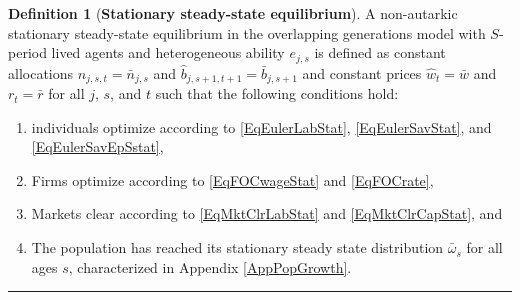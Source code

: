\documentclass[letterpaper,12pt]{article}
\theoremstyle{definition}
\newtheorem{definition}{Definition} %
\begin{document}
    \begin{definition}[\textbf{Stationary steady-state equilibrium}]\label{DefEquilSS}
      A non-autarkic stationary steady-state equilibrium in the overlapping generations model with $S$-period lived agents and heterogeneous ability $e_{j,s}$ is defined as constant allocations $n_{j,s,t}=\bar{n}_{j,s}$ and $\hat{b}_{j,s+1,t+1}=\bar{b}_{j,s+1}$ and constant prices $\hat{w}_t=\bar{w}$ and $r_t=\bar{r}$ for all $j$, $s$, and $t$ such that the following conditions hold:
       \begin{enumerate}
          \item individuals optimize according to \eqref{EqEulerLabStat}, \eqref{EqEulerSavStat}, and \eqref{EqEulerSavEpSstat},
          \item Firms optimize according to \eqref{EqFOCwageStat} and \eqref{EqFOCrate},
          \item Markets clear according to \eqref{EqMktClrLabStat} and \eqref{EqMktClrCapStat}, and
          \item The population has reached its stationary steady state distribution $\bar{\omega}_s$ for all ages $s$, characterized in Appendix \ref{AppPopGrowth}.
       \end{enumerate}
    \end{definition}
    \hrule
\end{document}
